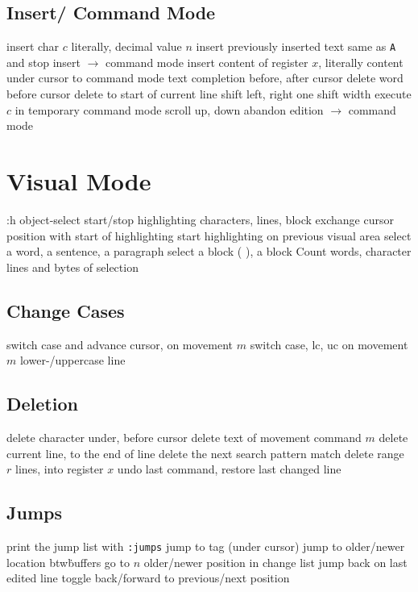 \subsection{Insert/ Command Mode}	{}
	{insert char $c$ literally, decimal value $n$}
	{insert previously inserted text}
	{same as {\tt\ctrl A} and stop insert $\to$ command mode}
	{insert content of register $x$, literally}
	{content under cursor to command mode}
	{text completion before, after cursor}
	{delete word before cursor}
	{delete to start of current line}
	{shift left, right one shift width}
	{execute $c$ in temporary command mode}
	{scroll up, down}
	{abandon edition $\to$ command mode}

\section{Visual Mode}	{:h object-select}
	{start/stop highlighting characters, lines, block}
	{exchange cursor position with start of highlighting}
	{start highlighting on previous visual area}
	{select a word, a sentence, a paragraph}
	{select a block ( ), a block {\tt\lapos}	{\tt\rapos}}
	{Count words, character lines and bytes of selection}

\subsection{Change Cases}{}
	{switch case and advance cursor, on movement $m$ }
	{switch case, lc, uc on movement $m$}
	{lower-/uppercase line}

\subsection{Deletion}	{}
	{delete character under, before cursor}
	{delete text of movement command $m$}
	{delete current line, to the end of line}
	{delete the next search pattern match}
	{delete range $r$ lines, into register $x$}
	{undo last command, restore last changed line}

\subsection{Jumps}	{print the jump list with {\tt :jumps}}
\cmdS{:ta \ctrl[ }	{jump to tag (under cursor)}
	{jump to older/newer location btw\. buffers}
	{go to $n$ older/newer position in change list}
	{jump back on last edited line}
	{toggle back/forward to previous/next position}

